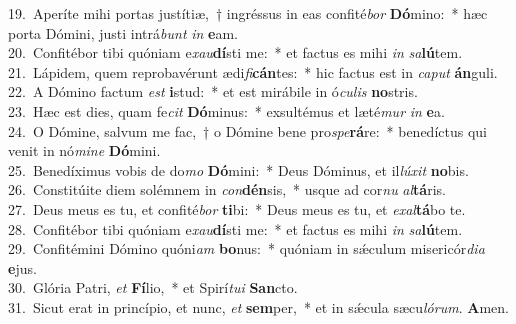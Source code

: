 {19.~}Aperíte mihi portas justítiæ,~† ingréssus in eas confité\textit{bor} \textbf{Dó}mino:~* hæc porta Dómini, justi intrá\textit{bunt} \textit{in} \textbf{e}am.\\
{20.~}Confitébor tibi quóniam e\textit{xau}\textbf{dí}sti me:~* et factus es mihi \textit{in} \textit{sa}\textbf{lú}tem.\\
{21.~}Lápidem, quem reprobavérunt ædi\textit{fi}\textbf{cán}tes:~* hic factus est in \textit{ca}\textit{put} \textbf{án}guli.\\
{22.~}A Dómino factum \textit{est} \textbf{i}stud:~* et est mirábile in ó\textit{cu}\textit{lis} \textbf{no}stris.\\
{23.~}Hæc est dies, quam fe\textit{cit} \textbf{Dó}minus:~* exsultémus et læté\textit{mur} \textit{in} \textbf{e}a.\\
{24.~}O Dómine, salvum me fac,~† o Dómine bene pro\textit{spe}\textbf{rá}re:~* benedíctus qui venit in nó\textit{mi}\textit{ne} \textbf{Dó}mini.\\
{25.~}Benedíximus vobis de do\textit{mo} \textbf{Dó}mini:~* Deus Dóminus, et il\textit{lú}\textit{xit} \textbf{no}bis.\\
{26.~}Constitúite diem solémnem in \textit{con}\textbf{dén}sis,~* usque ad cor\textit{nu} \textit{al}\textbf{tá}ris.\\
{27.~}Deus meus es tu, et confité\textit{bor} \textbf{ti}bi:~* Deus meus es tu, et \textit{e}\textit{xal}\textbf{tá}bo te.\\
{28.~}Confitébor tibi quóniam e\textit{xau}\textbf{dí}sti me:~* et factus es mihi \textit{in} \textit{sa}\textbf{lú}tem.\\
{29.~}Confitémini Dómino quóni\textit{am} \textbf{bo}nus:~* quóniam in sǽculum misericór\textit{di}\textit{a} \textbf{e}jus.\\
{30.~}Glória Patri, \textit{et} \textbf{Fí}lio,~* et Spirí\textit{tu}\textit{i} \textbf{San}cto.\\
{31.~}Sicut erat in princípio, et nunc, \textit{et} \textbf{sem}per,~* et in sǽcula sæcu\textit{ló}\textit{rum}. \textbf{A}men.\\
